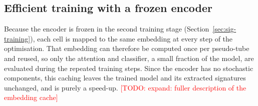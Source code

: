 \documentclass[11pt,a4paper]{article}
\newcommand{\todo}[1]{\textcolor{red}{[TODO: #1]}}
\begin{document}
\subsection{Efficient training with a frozen encoder}
\label{app:efficiency}
Because the encoder is frozen in the second training stage (Section~\ref{sec:sig-training}), each cell is mapped to the same embedding at every step of the optimisation. That embedding can therefore be computed once per pseudo-tube and reused, so only the attention and classifier, a small fraction of the model, are evaluated during the repeated training steps. Since the encoder has no stochastic components, this caching leaves the trained model and its extracted signatures unchanged, and is purely a speed-up. \todo{expand: fuller description of the embedding cache}
\end{document}
